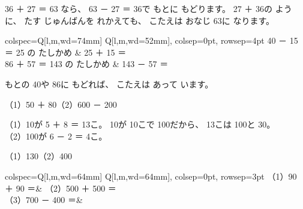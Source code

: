 \par
36 ＋ 27 ＝ 63 なら、 63 － 27 ＝ 36で もとに もどります。 27 ＋ 36の ように、 たす じゅんばんを れかえても、 こたえは おなじ 63に なります。

\par
\noindent\hspace*{1\zw}\begin{tblr}{colspec={Q[l,m,wd=74mm] Q[l,m,wd=52mm]}, colsep=0pt, rowsep=4pt}
40 － 15 ＝ 25 の たしかめ & 25 ＋ 15 ＝\enspace\bkkakikomi[16mm] \\
86 ＋ 57 ＝ 143 の たしかめ & 143 － 57 ＝\enspace\bkkakikomi[16mm] \\
\end{tblr}
\par\vspace{2pt}
\noindent もとの 40や 86に もどれば、 こたえは あって います。

\clearpage

\begin{reidai}
（1）50 ＋ 80\hspace{4\zw}（2）600 － 200

\kangaekata （1）10が 5 ＋ 8 ＝ 13こ。 10が 10こで 100だから、 13こは 100と 30。\\
（2）100が 6 － 2 ＝ 4こ。

\kotae （1）130\hspace{3\zw}（2）400
\end{reidai}

\begin{jibun}
\noindent\begin{tblr}{colspec={Q[l,m,wd=64mm] Q[l,m,wd=64mm]}, colsep=0pt, rowsep=3pt}
（1）90 ＋ 90 ＝\enspace\bkkakikomi[18mm] & （2）500 ＋ 500 ＝\enspace\bkkakikomi[18mm] \\
（3）700 － 400 ＝\enspace\bkkakikomi[18mm] &  \\
\end{tblr}
\end{jibun}

